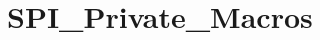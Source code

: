 \hypertarget{group___s_p_i___private___macros}{}\section{S\+P\+I\+\_\+\+Private\+\_\+\+Macros}
\label{group___s_p_i___private___macros}
